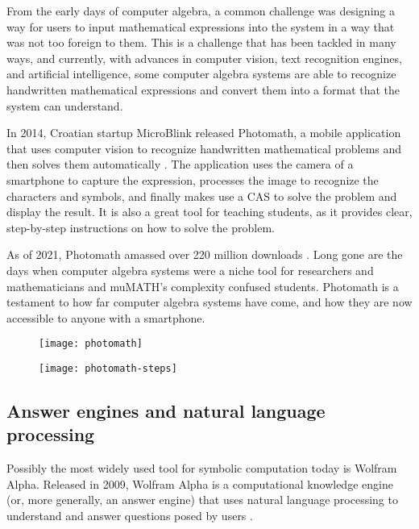 From the early days of computer algebra, a common challenge was designing a way for users to input mathematical expressions into the system in a way that was not too foreign to them. This is a challenge that has been tackled in many ways, and currently, with advances in computer vision, text recognition engines, and artificial intelligence, some computer algebra systems are able to recognize handwritten mathematical expressions and convert them into a format that the system can understand.

In 2014, Croatian startup MicroBlink released Photomath, a mobile application that uses computer vision to recognize handwritten mathematical problems and then solves them automatically \parencite{microblink-photomath}. The application uses the camera of a smartphone to capture the expression, processes the image to recognize the characters and symbols, and finally makes use a CAS to solve the problem and display the result. It is also a great tool for teaching students, as it provides clear, step-by-step instructions on how to solve the problem.

As of 2021, Photomath amassed over 220 million downloads \parencite{photomath-downloads}. Long gone are the days when computer algebra systems were a niche tool for researchers and mathematicians and muMATH's complexity confused students. Photomath is a testament to how far computer algebra systems have come, and how they are now accessible to anyone with a smartphone.

\begin{figure}[htb]
      {\texttt{[image: photomath]}}
\end{figure}

\begin{figure}[htb]
      {\texttt{[image: photomath-steps]}}
\end{figure}

\subsection{Answer engines and natural language processing}\label{subsec:answer-engines-and-natural-language-processing}

Possibly the most widely used tool for symbolic computation today is Wolfram Alpha. Released in 2009, Wolfram Alpha is a computational knowledge engine (or, more generally, an answer engine) that uses natural language processing to understand and answer questions posed by users \parencite{wolfram-alpha-about}.

